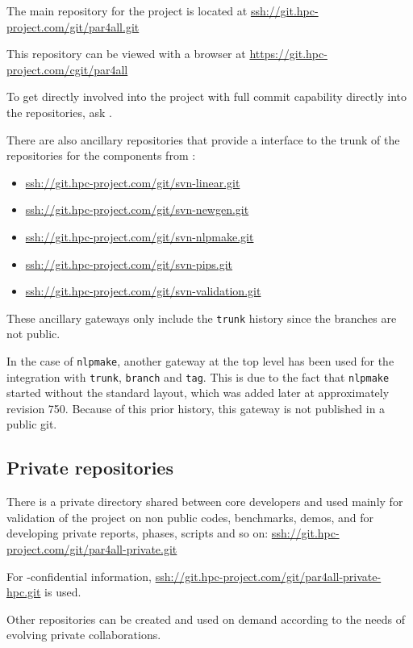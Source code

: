 \documentclass[a4paper]{article}
\begin{document}
The main repository for the project is located at
\url{ssh://git.hpc-project.com/git/par4all.git}

This repository can be viewed with a \Awww browser at
\url{https://git.hpc-project.com/cgit/par4all}

To get directly involved into the project with full commit capability
directly into the repositories, ask \Ahpcp.

There are also ancillary \Agit repositories that provide a \Agit interface to
the trunk of the \Asvn repositories for the \Apips components from
\Acri:
\begin{itemize}
\item \url{ssh://git.hpc-project.com/git/svn-linear.git}
\item \url{ssh://git.hpc-project.com/git/svn-newgen.git}
\item \url{ssh://git.hpc-project.com/git/svn-nlpmake.git}
\item \url{ssh://git.hpc-project.com/git/svn-pips.git}
\item \url{ssh://git.hpc-project.com/git/svn-validation.git}
\end{itemize}
These ancillary gateways only include the \texttt{trunk} history since the
\Acri branches are not public.

In the case of \texttt{nlpmake}, another \Agit{} \Asvn gateway at the top
level has been used for the integration with \texttt{trunk},
\texttt{branch} and \texttt{tag}. This is due to the fact that
\texttt{nlpmake} started without the standard
layout, which was added later at approximately revision 750. Because
of this prior history, this gateway is not published in a public git.

\subsection{Private repositories}
\label{sec:private-repositories}

There is a private directory shared between core developers and used mainly
for validation of the project on non public codes, benchmarks, demos,
and for developing private reports, phases, scripts and so on:
\url{ssh://git.hpc-project.com/git/par4all-private.git}

For \Ahpcp-confidential information,
\url{ssh://git.hpc-project.com/git/par4all-private-hpc.git} is used.

Other repositories can be created and used on demand according to the
needs of evolving private collaborations.
\end{document}
